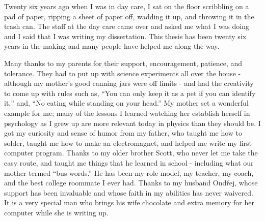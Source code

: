 
Twenty six years ago when I was in day care, I sat on the floor scribbling on a pad of paper, ripping a sheet of paper off, wadding it up, and throwing it in the trash can.  The staff at the day care came over and asked me what I was doing and I said that I was writing my dissertation.  This thesis has been twenty six years in the making and many people have helped me along the way.

Many thanks to my parents for their support, encouragement, patience, and tolerance.  They had to put up with science experiments all over the house - although my mother's good canning jars were off limits - and had the creativity to come up with rules such as, ``You can only keep it as a pet if you can identify it,'' and, ``No eating while standing on your head.''  My mother set a wonderful example for me; many of the lessons I learned watching her establish herself in psychology as I grew up are more relevant today in physics than they should be.  I got my curiosity and sense of humor from my father, who taught me how to solder, taught me how to make an electromagnet, and helped me write my first computer program.  Thanks to my older brother Scott, who never let me take the easy route, and taught me things that he learned in school - including what our mother termed ``bus words.''  He has been my role model, my teacher, my coach, and the best college roommate I ever had.  Thanks to my husband Ond\v{r}ej, whose support has been invaluable and whose faith in my abilities has never waivered.  It is a very special man who brings his wife chocolate and extra memory for her computer while she is writing up.

